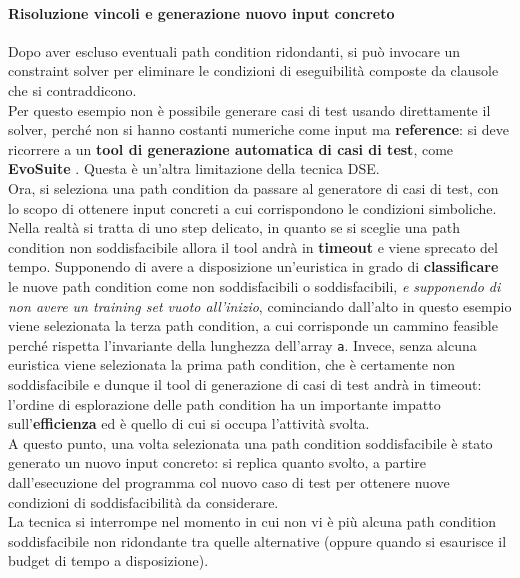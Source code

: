 \documentclass[a4paper, 12pt, oneside]{book}
\theoremstyle{normal}
\begin{document}
\paragraph{Risoluzione vincoli e generazione nuovo input concreto} Dopo aver escluso eventuali path condition ridondanti, si può invocare un constraint solver per eliminare le condizioni di eseguibilità composte da clausole che si contraddicono. \\ Per questo esempio non è possibile generare casi di test usando direttamente il solver, perché non si hanno costanti numeriche come input ma \textbf{reference}: si deve ricorrere a un \textbf{tool di generazione automatica di casi di test}, come \textbf{EvoSuite} \cite{fraser2011evosuite}. Questa è un'altra limitazione della tecnica DSE. \\ Ora, si seleziona una path condition da passare al generatore di casi di test, con lo scopo di ottenere input concreti a cui corrispondono le condizioni simboliche. Nella realtà si tratta di uno step delicato, in quanto se si sceglie una path condition non soddisfacibile allora il tool andrà in \textbf{timeout} e viene sprecato del tempo. Supponendo di avere a disposizione un'euristica in grado di \textbf{classificare} le nuove path condition come non soddisfacibili o soddisfacibili, \textit{e supponendo di non avere un training set vuoto all'inizio}, cominciando dall'alto in questo esempio viene selezionata la terza path condition, a cui corrisponde un cammino feasible perché rispetta l'invariante della lunghezza dell'array \verb|a|. Invece, senza alcuna euristica viene selezionata la prima path condition, che è certamente non soddisfacibile e dunque il tool di generazione di casi di test andrà in timeout: l'ordine di esplorazione delle path condition ha un importante impatto sull'\textbf{efficienza} ed è quello di cui si occupa l'attività svolta. \\ A questo punto, una volta selezionata una path condition soddisfacibile è stato generato un nuovo input concreto: si replica quanto svolto, a partire dall'esecuzione del programma col nuovo caso di test per ottenere nuove condizioni di soddisfacibilità da considerare. \\ La tecnica si interrompe nel momento in cui non vi è più alcuna path condition soddisfacibile non ridondante tra quelle alternative (oppure quando si esaurisce il budget di tempo a disposizione).
\end{document}
